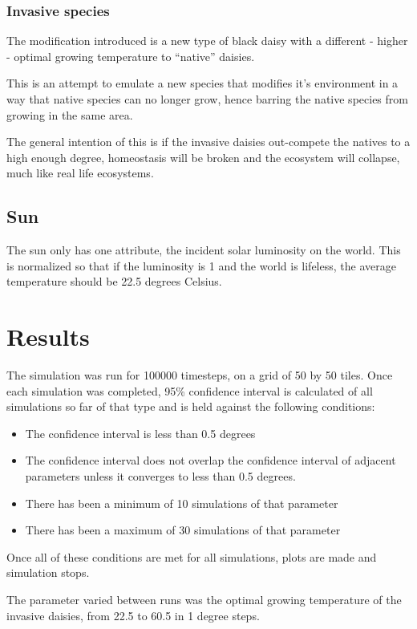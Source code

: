 \documentclass[12pt]{article}
\begin{document}
\subsubsection{Invasive species}
The modification introduced is a new type of black daisy with a
different - higher - optimal growing temperature to ``native''
daisies.

This is an attempt to emulate a new species that modifies it's
environment in a way that native species can no longer grow, hence
barring the native species from growing in the same area.

The general intention of this is if the invasive daisies out-compete
the natives to a high enough degree, homeostasis will be broken and
the ecosystem will collapse, much like real life ecosystems.

\subsection{Sun}
The sun only has one attribute, the incident solar luminosity on the
world. This is normalized so that if the luminosity is 1 and the world
is lifeless, the average temperature should be 22.5 degrees Celsius.

\section{Results}
The simulation was run for 100000 timesteps, on a grid of 50 by 50
tiles. Once each simulation was completed, 95\% confidence interval is
calculated of all simulations so far of that type and is held against
the following conditions:
\begin{itemize}
\item The confidence interval is less than 0.5 degrees
\item The confidence interval does not overlap the confidence interval
  of adjacent parameters unless it converges to less than 0.5 degrees.
\item There has been a minimum of 10 simulations of that parameter
\item There has been a maximum of 30 simulations of that parameter
\end{itemize}

Once all of these conditions are met for all simulations, plots are
made and simulation stops.

The parameter varied between runs was the optimal growing temperature
of the invasive daisies, from 22.5 to 60.5 in 1 degree steps.
\end{document}
